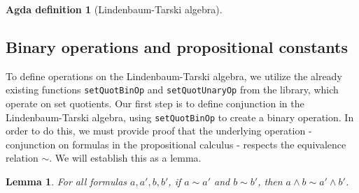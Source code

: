 \documentclass[titlepage]{article}
\newtheorem{lemma}{Lemma}[section]
\newtheorem{agdadef}{Agda definition}
\begin{document}
\begin{agdadef}[Lindenbaum-Tarski algebra]$ $
\end{agdadef}



\subsection{Binary operations and propositional constants}

To define operations on the Lindenbaum-Tarski algebra, we utilize the already existing functions \texttt{setQuotBinOp} and \texttt{setQuotUnaryOp} from the \agdaCubical library, which operate on set quotients. Our first step is to define conjunction in the Lindenbaum-Tarski algebra, using \texttt{setQuotBinOp} to create a binary operation. In order to do this, we must provide proof that the underlying operation - conjunction on formulas in the propositional calculus - respects the equivalence relation $\sim$. We will establish this as a lemma.

\begin{lemma}
    For all formulas $a,a',b,b'$, if $a\sim a'$ and $b \sim b'$, then $a\wedge b \sim a' \wedge b'$.
\end{lemma}
\end{document}
